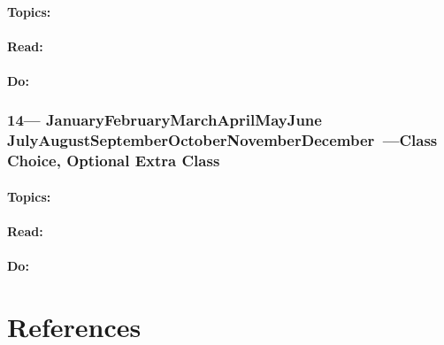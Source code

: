 \documentclass[10pt]{article}
\def\themonth{\ifcase\month\or
	January\or February\or March\or April\or May\or June\or
	July\or August\or September\or October\or November\or December\fi}
\begin{document}
\subsection{Topics:}
\subsection{Read:}
\subsection{Do:}

\AdvanceDate[7]
\section{14---\themonth~\the\day---Class Choice, Optional Extra Class}
\subsection{Topics:}
\subsection{Read:}
\subsection{Do:}

\part{References}
%

\end{document}
